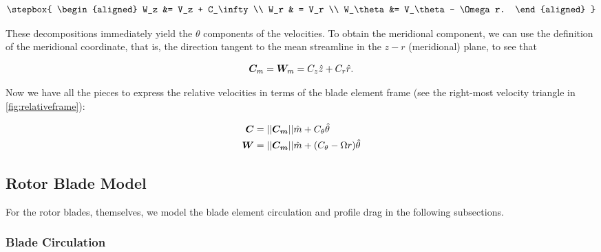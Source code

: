 \begin{equation}
    \label{eqn:relativevelocities}
    \stepbox{
        \begin{aligned}
            W_z &= V_z + C_\infty \\
            W_r & = V_r \\
            W_\theta &= V_\theta - \Omega r.
        \end{aligned}
    }
\end{equation}

\noindent These decompositions immediately yield the \(\theta\) components of the velocities.
%
To obtain the meridional component, we can use the definition of the meridional coordinate, that is, the direction tangent to the mean streamline in the \(z-r\) (meridional) plane, to see that

\begin{equation}
    \label{eqn:vmwm}
        \bm{C}_m = \bm{W}_m = C_z \hat{z} + C_r \hat{r}.
\end{equation}

\noindent Now we have all the pieces to express the relative velocities in terms of the blade element frame (see the right-most velocity triangle in \cref{fig:relativeframe}):

\begin{align}
    \bm{C} &= ||\bm{C_m}||\hat{m} + C_\theta \hat{\theta} \\
    \label{eqn:inflowvelocity}
    \bm{W} &= ||\bm{C_m}||\hat{m} + (C_\theta - \Omega r) \hat{\theta}
\end{align}




\subsection{Rotor Blade Model}
\label{ssec:bladeelementmodel}

For the rotor blades, themselves, we model the blade element circulation and profile drag in the following subsections.

\subsubsection{Blade Circulation}
\label{ssec:bladecirculation}

